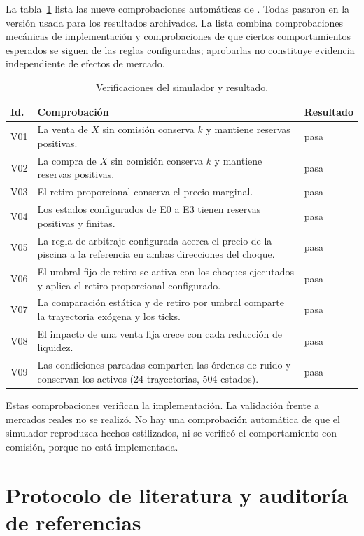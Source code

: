 La tabla~\ref{tab:verificacion} lista las nueve comprobaciones automáticas de . Todas pasaron en la versión usada para los resultados archivados. La lista combina comprobaciones mecánicas de implementación y comprobaciones de que ciertos comportamientos esperados se siguen de las reglas configuradas; aprobarlas no constituye evidencia independiente de efectos de mercado.

\begin{table}[htbp]
\centering
\caption{Verificaciones del simulador y resultado.}
\label{tab:verificacion}
\small
\begin{tabularx}{\textwidth}{@{}l X l@{}}
\toprule
Id. & Comprobación & Resultado \\
\midrule
V01 & La venta de $X$ sin comisión conserva $k$ y mantiene reservas positivas. & pasa \\
V02 & La compra de $X$ sin comisión conserva $k$ y mantiene reservas positivas. & pasa \\
V03 & El retiro proporcional conserva el precio marginal. & pasa \\
V04 & Los estados configurados de E0 a E3 tienen reservas positivas y finitas. & pasa \\
V05 & La regla de arbitraje configurada acerca el precio de la piscina a la referencia en ambas direcciones del choque. & pasa \\
V06 & El umbral fijo de retiro se activa con los choques ejecutados y aplica el retiro proporcional configurado. & pasa \\
V07 & La comparación estática y de retiro por umbral comparte la trayectoria exógena y los ticks. & pasa \\
V08 & El impacto de una venta fija crece con cada reducción de liquidez. & pasa \\
V09 & Las condiciones pareadas comparten las órdenes de ruido y conservan los activos (24 trayectorias, 504 estados). & pasa \\
\bottomrule
\end{tabularx}
\end{table}

Estas comprobaciones verifican la implementación. La validación frente a mercados reales no se realizó. No hay una comprobación automática de que el simulador reproduzca hechos estilizados, ni se verificó el comportamiento con comisión, porque no está implementada.

\section{Protocolo de literatura y auditoría de referencias}
\label{sec:protocolo-literatura}

